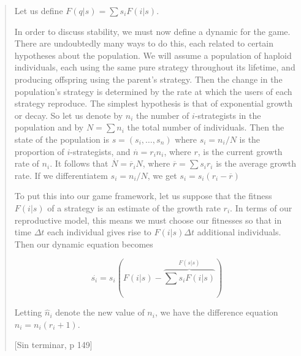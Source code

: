 \documentclass[a4paper,10pt]{article}
\begin{document}
\begin{quotation}
    Let us define $F(q|s) = \sum s_i F(i|s)$.
    
    In order to discuss stability, we must now define a dynamic for the game. 
    There are undoubtedly many ways to do this, each related to certain hypotheses about the population.
    We will assume a population of haploid individuals, each using the same pure strategy throughout its lifetime, and producing offspring using the parent’s strategy. 
    Then the change in the population's strategy is determined by the rate at which the users of each strategy reproduce.
    The simplest hypothesis is that of exponential growth or decay. 
    So let us denote by $n_i$ the number of $i$-strategists in the population and by $N=\sum n_i$ the total number of individuals.
    Then the state of the population is $s=(s_i,\dots,s_n)$ where $s_i = n_i/N$ is the proportion of $i$-strategists, and $ \overset{.}{n} = r_i n_i$, where $r$, is the current growth rate of $n_i$. 
    It follows that $ \overset{.}{N} = \overline{r}_i N$, where $\overline{r} = \sum s_i r_i$ is the average growth rate.
    If we differentiatem $s_i = n_i/ N$, we get $s_i = s_i (r_i - \overline{r})$
    
    To put this into our game framework, let us suppose that the fitness $F(i|s)$ of a strategy is an estimate of the growth rate $r_i$.
    In terms of our reproductive model, this means we must choose our fitnesses so that in time $\Delta t$ each individual gives rise to $F(i|s) \Delta t$ additional individuals.
    Then our dynamic equation becomes
    
    \begin{equation}
     \overset{.}{s_i} = s_i (F(i|s) - \overbrace{\sum s_i F(i|s)}^{F(s|s)} )
    \end{equation}
    
    Letting $\hat{n}_i $ denote the new value of $n_i$, we have the difference equation $\hat{n}_i = n_i (r_i + 1)$.
    
    [Sin terminar, p 149]
    
    
\end{quotation}

\\
\end{document}
